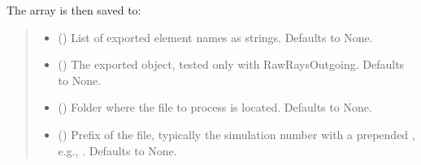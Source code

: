 \documentclass[letterpaper,10pt,english]{sphinxmanual}
\begin{document}
\begin{fulllineitems}
\begin{fulllineitems}
\sphinxAtStartPar
The array is then saved to:
\begin{quote}

\sphinxAtStartPar
{}
\end{quote}
\begin{quote}\begin{description}
\begin{itemize}
\item {} 
\sphinxAtStartPar
{} (\sphinxstyleliteralemphasis{\sphinxupquote{, }}) \textendash{} List of exported element names as strings.
Defaults to None.

\item {} 
\sphinxAtStartPar
{} (\sphinxstyleliteralemphasis{\sphinxupquote{, }}) \textendash{} The exported object, tested only with RawRaysOutgoing.
Defaults to None.

\item {} 
\sphinxAtStartPar
{} (\sphinxstyleliteralemphasis{\sphinxupquote{, }}) \textendash{} Folder where the file to process is located.
Defaults to None.

\item {} 
\sphinxAtStartPar
{} (\sphinxstyleliteralemphasis{\sphinxupquote{, }}) \textendash{} Prefix of the file, typically the simulation number with a
prepended \sphinxtitleref{\_}, e.g., . Defaults to None.

\end{itemize}

\end{description}\end{quote}

\end{fulllineitems}


\end{fulllineitems}
\end{document}
